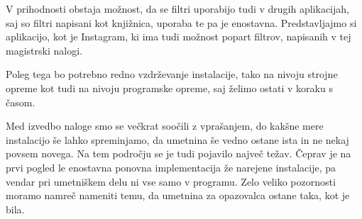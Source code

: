 \documentclass[a4paper, 12pt]{book}
\begin{document}
V prihodnosti obstaja možnost, da se filtri uporabijo tudi v drugih
aplikacijah, saj so filtri napisani kot knjižnica, uporaba te pa je
enostavna. Predstavljajmo si aplikacijo, kot je Instagram, ki ima tudi
možnost popart filtrov, napisanih v tej magistrski nalogi.

Poleg tega bo potrebno redno vzdrževanje instalacije, tako na
nivoju strojne opreme kot tudi na nivoju programske opreme, saj želimo ostati
v koraku s časom.

Med izvedbo naloge smo se večkrat soočili z vprašanjem, do kakšne mere
instalacijo še lahko spreminjamo, da umetnina še vedno ostane ista in ne nekaj
povsem novega. Na tem področju se je tudi pojavilo največ težav. Čeprav je na
prvi pogled le enostavna ponovna implementacija že narejene instalacije, pa
vendar pri umetniškem delu ni vse samo v programu. Zelo veliko pozornosti
moramo namreč nameniti temu, da umetnina za opazovalca ostane taka, kot je
bila.






\end{document}
